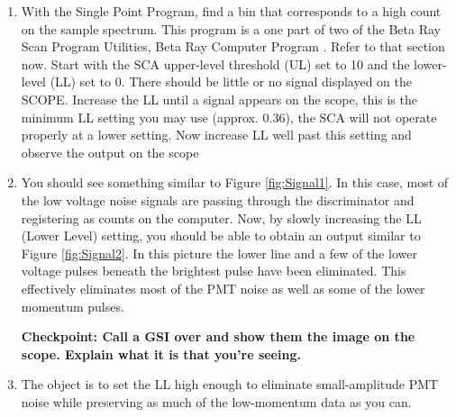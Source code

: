 \documentclass{../lab}
\begin{document}
\begin{enumerate}
    \item With the Single Point Program, find a bin that corresponds to a high count on the sample spectrum. This program is a one part of two of the Beta Ray Scan Program Utilities, Beta Ray Computer Program \cite{Krane}. Refer to that section now. Start with the SCA upper-level threshold (UL) set to 10 and the lower-level (LL) set to 0. There should be little or no signal displayed on the SCOPE. Increase the LL until a signal appears on the scope, this is the minimum LL setting you may use (approx. 0.36), the SCA will not operate properly at a lower setting. Now increase LL well past this setting and observe the output on the scope

    \item You should see something similar to Figure \ref{fig:Signal1}. In this case, most of the low voltage noise signals are passing through the discriminator and registering as counts on the computer. Now, by slowly increasing the LL (Lower Level) setting, you should be able to obtain an output similar to Figure \ref{fig:Signal2}. In this picture the lower line and a few of the lower voltage pulses beneath the brightest pulse have been eliminated. This effectively eliminates most of the PMT noise as well as some of the lower momentum pulses.
    
    \textbf{Checkpoint: Call a GSI over and show them the image on the scope. Explain what it is that you're seeing.}

    \item The object is to set the LL high enough to eliminate small-amplitude PMT noise while preserving as much of the low-momentum data as you can.


\end{enumerate}
\end{document}

